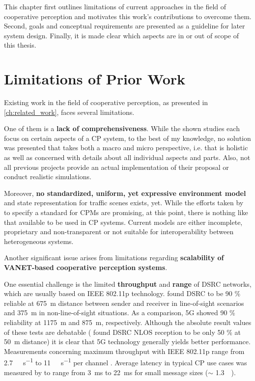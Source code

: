 This chapter first outlines limitations of current approaches in the field of cooperative perception and motivates this work's contributions to overcome them. Second, goals and conceptual requirements are presented as a guideline for later system design. Finally, it is made clear which aspects are in or out of scope of this thesis.

\section{Limitations of Prior Work}
\label{sec:problem_analysis:limitations_of_prior_work}

Existing work in the field of cooperative perception, as presented in \cref{ch:related_work}, faces several limitations.
\par
\bigskip

One of them is a \textbf{lack of comprehensiveness}. While the shown studies each focus on certain aspects of a CP system, to the best of my knowledge, no solution was presented that takes both a macro and micro perspective, i.e. that is holistic as well as concerned with details about all individual aspects and parts. Also, not all previous projects provide an actual implementation of their proposal or conduct realistic simulations.
\par
\bigskip

Moreover, \textbf{no standardized, uniform, yet expressive environment model} and state representation for traffic scenes exists, yet. While the efforts taken by \cite{EuropeanTelecommunicationsStandardsInstituteETSI2019} to specify a standard for CPMs are promising, at this point, there is nothing like that available to be used in CP systems. Current models are either incomplete, proprietary and non-transparent or not suitable for interoperability between heterogeneous systems. 
\par
\bigskip

Another significant issue arises from limitations regarding \textbf{scalability of VANET-based cooperative perception systems}.

One essential challenge is the limited \textbf{throughput} and \textbf{range} of DSRC networks, which are usually based on IEEE 802.11p technology. \cite{5GAutomotiveAssociation2018} found DSRC to be 90 \% reliable at \SI{675}{\meter} distance between sender and receiver in line-of-sight scenarios and \SI{375}{\meter} in non-line-of-sight situations. As a comparison, 5G showed 90 \% reliability at \SI{1175}{\meter} and \SI{875}{\meter}, respectively. Although the absolute result values of these tests are debatable (\cite{Mangel2011} found DSRC NLOS reception to be only 50 \% at \SI{50}{\meter} distance) it is clear that 5G technology generally yields better performance. Measurements concerning maximum throughput with IEEE 802.11p range from \SI{2.7}{\mega\bit\per\second} to \SI{11}{\mega\bit\per\second} per channel \cite{Chen2016, Wang2013}. Average latency in typical CP use cases was measured by \cite{Rauch2011} to range from \SI{3}{\milli\second} to \SI{22}{\milli\second} for small message sizes ($\sim$ \SI{1.3}{\kilo\byte}).

